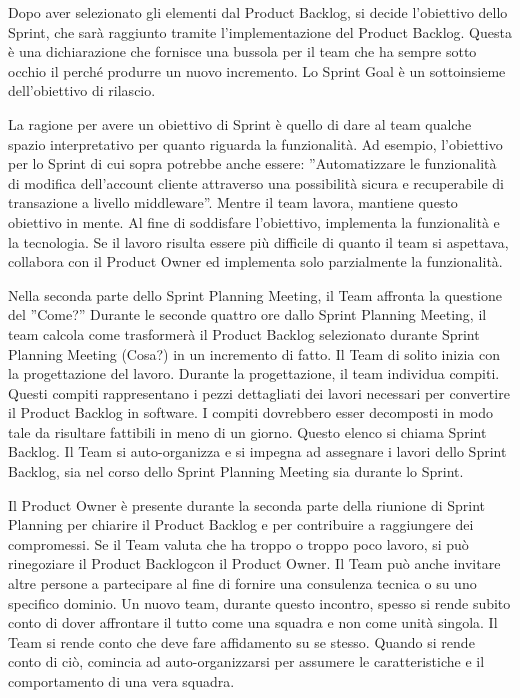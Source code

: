 Dopo aver selezionato  gli elementi dal Product Backlog, si decide l'obiettivo dello Sprint, che sar\`a raggiunto tramite
l'implementazione del Product Backlog. Questa \`e una dichiarazione che fornisce una bussola per il team che ha sempre
sotto occhio il perch\'e produrre un nuovo incremento. Lo Sprint Goal \`e un sottoinsieme dell'obiettivo di rilascio.
\newline

La ragione per avere un obiettivo di Sprint \`e quello di dare al team qualche spazio interpretativo per quanto
riguarda la funzionalit\`a. Ad esempio, l'obiettivo per lo Sprint di cui sopra potrebbe anche essere: ''Automatizzare
le funzionalit\`a di modifica dell'account cliente attraverso una possibilit\`a sicura e recuperabile di transazione a livello middleware''. Mentre il team lavora, mantiene questo obiettivo in mente. Al fine di soddisfare l'obiettivo, implementa
la funzionalit\`a e la tecnologia. Se il lavoro risulta essere pi\`u difficile di quanto il team si aspettava,
collabora con il Product Owner ed implementa solo parzialmente la funzionalit\`a. 
\newline

Nella seconda parte dello Sprint Planning Meeting, il Team affronta la questione del ''Come?'' Durante le seconde
quattro ore dallo Sprint Planning Meeting, il team calcola come trasformer\`a il Product Backlog selezionato durante
Sprint Planning Meeting (Cosa?) in un incremento di fatto. Il Team di solito inizia con la progettazione del lavoro.
Durante la progettazione, il team individua compiti. Questi compiti rappresentano i pezzi dettagliati dei lavori
necessari per convertire il Product Backlog in software. I compiti dovrebbero esser decomposti in modo tale da risultare
fattibili in meno di un giorno. Questo elenco si chiama Sprint Backlog. Il Team si auto-organizza e si impegna ad
assegnare i lavori dello Sprint Backlog, sia nel corso dello Sprint Planning Meeting sia durante lo Sprint. 
\newline

Il Product Owner \`e presente durante la seconda parte della riunione di Sprint Planning per chiarire il Product
Backlog e per contribuire a raggiungere dei compromessi. Se il Team valuta che ha troppo o troppo poco lavoro, si
pu\`o rinegoziare il Product Backlogcon il Product Owner. Il Team pu\`o anche invitare altre persone a partecipare al
fine di fornire una consulenza tecnica o su uno specifico dominio. Un nuovo team, durante questo incontro, spesso si rende subito
conto di dover affrontare il tutto come una squadra e non come unit\`a singola. Il Team si rende conto che deve fare
affidamento su se stesso. Quando si rende conto di ci\`o, comincia ad auto-organizzarsi per assumere le caratteristiche e il
comportamento di una vera squadra.

